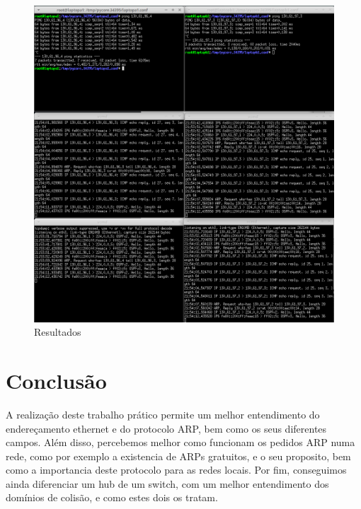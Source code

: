 \documentclass{article}
\begin{document}
\newpage
\begin{figure}[h]
	\centering
	\includegraphics[scale = 0.3]{ex-16.PNG}
	\caption{Resultados}
\end{figure}

\section{Conclusão}
A realização deste trabalho prático permite um melhor entendimento do endereçamento ethernet e do protocolo ARP, bem como os seus diferentes campos. Além disso, percebemos melhor como funcionam os pedidos ARP numa rede, como por exemplo a existencia de ARPs gratuitos, e o seu proposito, bem como a importancia deste protocolo para as redes locais. Por fim, conseguimos ainda diferenciar um hub de um switch, com um melhor entendimento dos domínios de colisão, e como estes dois os tratam.

\printindex
\end{document}
